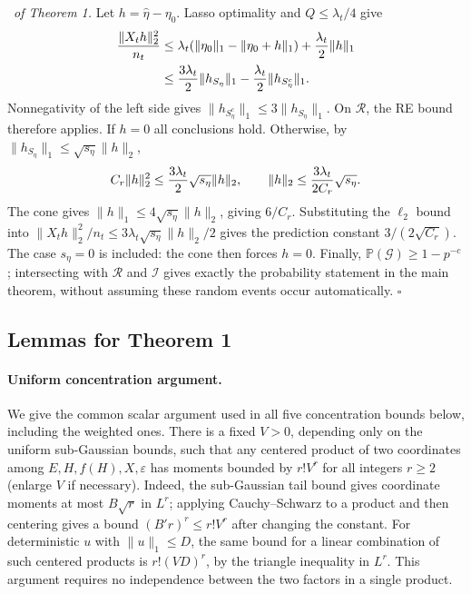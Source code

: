 \documentclass[12pt]{article}
\newenvironment{pf}{{\noindent \it Proof}\ }{\hfill $\square$\par}
\begin{document}
\begin{pf}{\it of Theorem 1.}
Let $h=\hat\eta-\eta_0$. Lasso optimality and $Q\le\lambda_t/4$ give
\begin{align}
 {\|X_th\|_2^2\over n_t}
 &\le\lambda_t(\|\eta_0\|_1-\|\eta_0+h\|_1)
                  +{\lambda_t\over2}\|h\|_1\notag\\
 &\le{3\lambda_t\over2}\|h_{S_\eta}\|_1
                  -{\lambda_t\over2}\|h_{S_\eta^c}\|_1.
 \label{eq:sup:oracle_inequality}
\end{align}
Nonnegativity of the left side gives
$\|h_{S_\eta^c}\|_1\le3\|h_{S_\eta}\|_1$.
On $\mathcal R$, the RE bound therefore applies. If $h=0$ all conclusions
hold. Otherwise, by $\|h_{S_\eta}\|_1\le\sqrt{s_\eta}\|h\|_2$,
\[
 C_r\|h\|_2^2\le {3\lambda_t\over2}\sqrt{s_\eta}\|h\|_2,
 \qquad \|h\|_2\le{3\lambda_t\over2C_r}\sqrt{s_\eta}.
\]
The cone gives $\|h\|_1\le4\sqrt{s_\eta}\|h\|_2$, giving $6/C_r$.
Substituting the $\ell_2$ bound into
$\|X_th\|_2^2/n_t\le3\lambda_t\sqrt{s_\eta}\|h\|_2/2$
gives the prediction constant $3/(2\sqrt{C_r})$.
The case $s_\eta=0$ is included: the cone then forces $h=0$.
Finally, $\mathbb P(\mathcal G)\ge1-p^{-c}$; intersecting with
$\mathcal R$ and $\mathcal I$ gives exactly the probability statement in
the main theorem, without assuming these random events occur automatically.
\end{pf}

\subsection{Lemmas for Theorem 1}
\paragraph{Uniform concentration argument.}
We give the common scalar argument used in all five concentration bounds
below, including the weighted ones. There is a fixed $V>0$, depending only
on the uniform sub-Gaussian bounds, such that any centered product of two
coordinates among $E,H,f(H),X,\varepsilon$ has moments bounded by
$r!V^r$ for all integers $r\ge2$ (enlarge $V$ if necessary).
Indeed, the sub-Gaussian tail bound gives coordinate moments at most
$B\sqrt r$ in $L^r$; applying Cauchy--Schwarz to a product and then
centering gives a bound $(B' r)^r\le r!V^r$ after changing the constant.
For deterministic $u$ with $\|u\|_1\le D$, the same bound for a linear
combination of such centered products is $r!(VD)^r$, by the triangle
inequality in $L^r$. This argument requires no independence between the
two factors in a single product.
\end{document}
